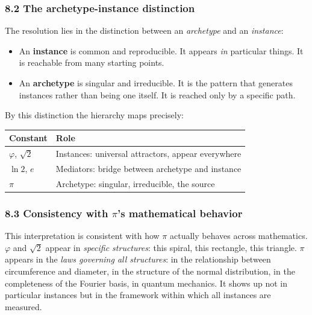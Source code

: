 \documentclass[
  11pt,
  letterpaper,
]{article}
\providecommand{\tightlist}{%
  \setlength{\itemsep}{0pt}\setlength{\parskip}{0pt}}
\begin{document}
\subsubsection{8.2 The archetype-instance
distinction}\label{the-archetype-instance-distinction}

The resolution lies in the distinction between an \emph{archetype} and
an \emph{instance}:

\begin{itemize}
\tightlist
\item
  An \textbf{instance} is common and reproducible. It appears \emph{in}
  particular things. It is reachable from many starting points.
\item
  An \textbf{archetype} is singular and irreducible. It is the pattern
  that generates instances rather than being one itself. It is reached
  only by a specific path.
\end{itemize}

By this distinction the hierarchy maps precisely:

\begin{longtable}[]{@{}
  >{\raggedright\arraybackslash}p{}
  >{\raggedright\arraybackslash}p{}@{}}
\toprule\noalign{}
\begin{minipage}[b]{\linewidth}\raggedright
Constant
\end{minipage} & \begin{minipage}[b]{\linewidth}\raggedright
Role
\end{minipage} \\
\midrule\noalign{}
\endhead
\bottomrule\noalign{}
\endlastfoot
\(\varphi\), \(\sqrt{2}\) & Instances: universal attractors, appear
everywhere \\
\(\ln 2\), \(e\) & Mediators: bridge between archetype and instance \\
\(\pi\) & Archetype: singular, irreducible, the source \\
\end{longtable}

\subsubsection{\texorpdfstring{8.3 Consistency with \(\pi\)'s
mathematical
behavior}{8.3 Consistency with \textbackslash pi's mathematical behavior}}\label{consistency-with-pis-mathematical-behavior}

This interpretation is consistent with how \(\pi\) actually behaves
across mathematics. \(\varphi\) and \(\sqrt{2}\) appear in
\emph{specific structures}: this spiral, this rectangle, this triangle.
\(\pi\) appears in the \emph{laws governing all structures}: in the
relationship between circumference and diameter, in the structure of the
normal distribution, in the completeness of the Fourier basis, in
quantum mechanics. It shows up not in particular instances but in the
framework within which all instances are measured.
\end{document}
